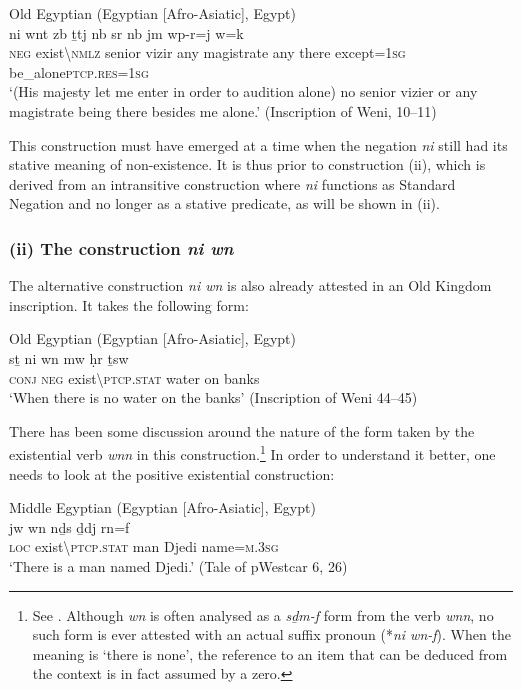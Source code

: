 \documentclass[output=paper,draft,draftmode,colorlinks,citecolor=brown]{langscibook}
\begin{document}
\ea Old Egyptian (Egyptian [Afro-Asiatic], Egypt) \label{ex:AE22}\\ 
    \gll ni wnt z{\ꜣ}b ṯ{\ꜣ}tj nb sr nb jm wp-r=j  w{\ꜥ}=k \\
    \textsc{neg} exist\textbackslash\textsc{nmlz} senior vizir any magistrate any there except=\textsc{1sg} be\_alone\textsc{ptcp.res=1sg}\\ 
    \glt ‘(His majesty let me enter in order to audition alone) no senior vizier or any magistrate being there besides me alone.’ (Inscription of Weni, 10–11) 
\z 


This construction must have emerged at a time when the negation \textit{ni} still had its stative meaning of non-existence. It is thus prior to construction (ii), which is derived from an intransitive construction where \textit{ni} functions as Standard Negation and no longer as a stative predicate, as will be shown in (ii). 


\subsubsection*{(ii) The construction \textit{ni wn}}


The alternative construction \textit{ni wn} is also already attested in an Old Kingdom inscription. It takes the following form: 

\ea Old Egyptian (Egyptian [Afro-Asiatic], Egypt) \label{ex:AE23}\\
    \gll sṯ ni wn mw ḥr ṯsw\\
    \textsc{conj} \textsc{neg} exist\textbackslash\textsc{ptcp.stat} water on banks\\ 
    \glt ‘When there is no water on the banks’ (Inscription of Weni 44–45) 
\z

There has been some discussion around the nature of the form taken by the existential verb \textit{wnn} in this construction.\footnote{See \citet{Meltzer1990}. Although \textit{wn} is often analysed as a \textit{sḏm-f} form from the verb \textit{wnn}, no such form is ever attested with an actual suffix pronoun (*\textit{ni wn-f}).
When the meaning is ‘there is none’, the reference to an item that can be deduced from the context is in fact assumed by a zero. } In order to understand it better, one needs to look at the positive existential construction:  
 
\ea Middle Egyptian (Egyptian [Afro-Asiatic], Egypt) \label{ex:AE24}\\
    \gll jw wn nḏs ḏdj rn=f\\
    \textsc{loc} exist\textbackslash\textsc{ptcp.stat} man Djedi name=\textsc{m.3sg}\\ 
    \glt ‘There is a man named Djedi.’ (Tale of pWestcar 6, 26) 
\z 
 
\end{document}
